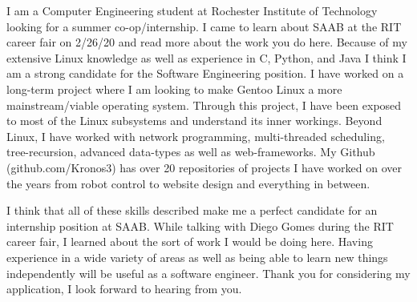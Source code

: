 \documentclass[16pt, a4paper]{awesome-cv}
\begin{document}
\makecvheader
\vspace{3cm}
\begin{cvletter}

\par I am a Computer Engineering student at Rochester Institute of Technology looking for a summer co-op/internship. I came to learn about SAAB at the RIT career fair on 2/26/20 and read more about the work you do here. Because of my extensive Linux knowledge as well as experience in C, Python, and Java I think I am a strong candidate for the Software Engineering position. I have worked on a long-term project where I am looking to make Gentoo Linux a more mainstream/viable operating system. Through this project, I have been exposed to most of the Linux subsystems and understand its inner workings. Beyond Linux, I have worked with network programming, multi-threaded scheduling, tree-recursion, advanced data-types as well as web-frameworks. My Github (github.com/Kronos3) has over 20 repositories of projects I have worked on over the years from robot control to website design and everything in between.

\par I think that all of these skills described make me a perfect candidate for an internship position at SAAB. While talking with Diego Gomes during the RIT career fair, I learned about the sort of work I would be doing here. Having experience in a wide variety of areas as well as being able to learn new things independently will be useful as a software engineer. Thank you for considering my application, I look forward to hearing from you.


\end{cvletter}

\makeletterclosing
\end{document}
